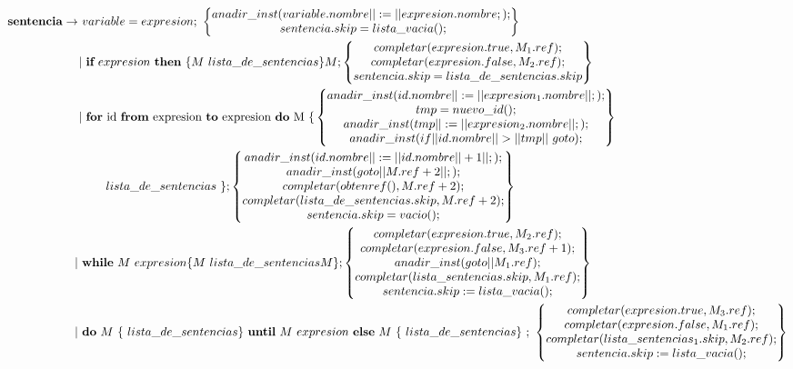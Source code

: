 \documentclass[12pt,a4paper,landscape]{article}
\theoremstyle{mytheor}
\begin{document}
\begin{alignat*}{2}
  \text{\textbf{sentencia}} \to\ & variable = expresion;\ \begin{Bmatrix} anadir\_inst(variable.nombre||:=||expresion.nombre;);\\ sentencia.skip=lista\_vacia();\end{Bmatrix}\\
 |&\ \textbf{if}\ expresion\ \textbf{then}\ \{M\ lista\_de\_sentencias\}M; \begin{Bmatrix} completar(expresion.true,M_1.ref); \\ completar(expresion.false,M_2.ref);\\ sentencia.skip=lista\_de\_sentencias.skip \end{Bmatrix} \\
 |&\text{ \textbf{for} id \textbf{from} expresion \textbf{to} expresion \textbf{do} M \{}\begin{Bmatrix} anadir\_inst(id.nombre||:=||expresion_1.nombre||;);\\ tmp = nuevo\_id();\\ anadir\_inst(tmp||:=||expresion_2.nombre||;);\\ anadir\_inst(if||id.nombre||>||tmp||\ goto);\end{Bmatrix} \\
     &\ \ \ \ \ \ lista\_de\_sentencias\ \}; \begin{Bmatrix} anadir\_inst(id.nombre||:=||id.nombre|| + 1||;);\\ anadir\_inst(goto||M.ref +2||;);\\ completar(obtenref(), M.ref+2);\\completar(lista\_de\_sentencias.skip, M.ref+2);\\  sentencia.skip = vacio();\end{Bmatrix} \\
 |\ &\textbf{while}\ M\ expresion \{M\ lista\_de\_sentencias M\}; \begin{Bmatrix} completar(expresion.true,M_2.ref); \\ completar(expresion.false,M_3.ref+1);\\ anadir\_inst(goto||M_1.ref);\\completar(lista\_sentencias.skip,M_1.ref);\\sentencia.skip:=lista\_vacia(); \end{Bmatrix} \\
 |\ &\textbf{do}\ M\ \{\ lista\_de\_sentencias \}\ \textbf{until}\ M\ expresion\ \textbf{else}\ M\ \{\ lista\_de\_sentencias\}\ ;\ \begin{Bmatrix} completar(expresion.true,M_3.ref); \\ completar(expresion.false,M_1.ref);\\ completar(lista\_sentencias_1.skip,M_2.ref);\\sentencia.skip:=lista\_vacia(); \end{Bmatrix} \\
\end{alignat*}
\end{document}
